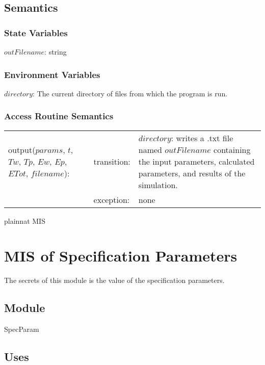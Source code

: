 \documentclass[12pt]{article}
\begin{document}
\subsection{Semantics}

\subsubsection{State Variables}

$outFilename$: string

\subsubsection{Environment Variables}

$directory$: The current directory of files from which the program is run.

\subsubsection{Access Routine Semantics}

\begin{center}
\begin{tabular}{l l p{4cm}}
output($params$, $t$, $Tw$, $Tp$, $Ew$, $Ep$, $ETot$, $filename$): & transition:
  & $directory$: writes a .txt file named $outFilename$ containing the input
    parameters, calculated parameters, and results of the simulation. \\

& exception: & none \\
\end{tabular}
\end{center}

 {plainnat}
 {MIS}

\newpage
\section{MIS of Specification Parameters} \label{SpecParam}

The secrets of this module is the value of the specification parameters.

\subsection{Module}

SpecParam

\subsection{Uses}
\end{document}
